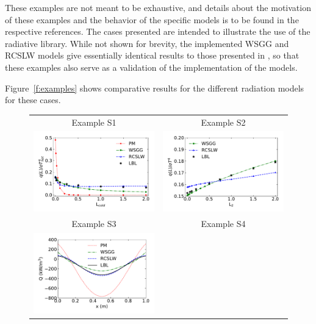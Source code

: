 \documentclass[preprint,12pt, a4paper]{elsarticle}
\begin{document}
These examples are not meant to be exhaustive, and details about the motivation of these examples and the behavior of the specific models is to be found in the respective references. The cases presented are intended to illustrate the use of the radiative library. While not shown  for brevity, the implemented WSGG and RCSLW models give essentially identical results to those presented in \cite{Solovjov_2017,Bordbar_2020}, so that these examples also serve as a validation of the implementation of the models.

Figure~\ref{f:examples} shows comparative results for the different radiation models for these cases. 
%
\begin{figure}
    \begin{center}
    \begin{tabular}{c c}
        Example S1 & Example S2 \\
        \includegraphics[width=3 in]{ex_1.pdf} &
        \includegraphics[width=3 in]{ex_2b.pdf} \\
        Example S3 & Example S4 \\
        \includegraphics[width=3 in]{ex_3a.pdf} &

\end{tabular}
\end{center}
\end{figure}
\end{document}
